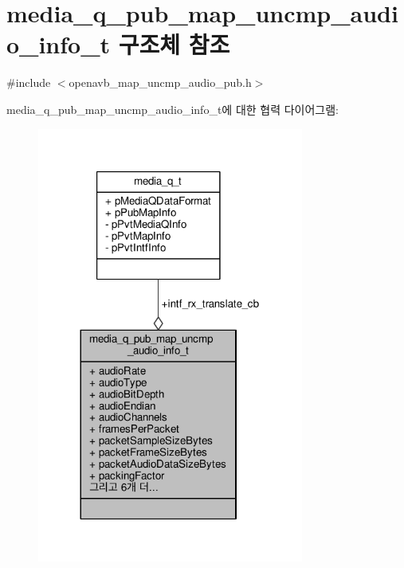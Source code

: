 \hypertarget{structmedia__q__pub__map__uncmp__audio__info__t}{}\section{media\+\_\+q\+\_\+pub\+\_\+map\+\_\+uncmp\+\_\+audio\+\_\+info\+\_\+t 구조체 참조}
\label{structmedia__q__pub__map__uncmp__audio__info__t}


{\ttfamily \#include $<$openavb\+\_\+map\+\_\+uncmp\+\_\+audio\+\_\+pub.\+h$>$}



media\+\_\+q\+\_\+pub\+\_\+map\+\_\+uncmp\+\_\+audio\+\_\+info\+\_\+t에 대한 협력 다이어그램\+:
\nopagebreak
\begin{figure}[H]
\begin{center}
\leavevmode
\includegraphics[width=248pt]{structmedia__q__pub__map__uncmp__audio__info__t__coll__graph}
\end{center}
\end{figure}
